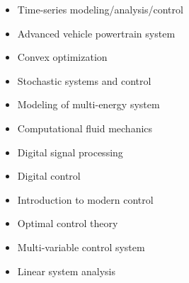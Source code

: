 \documentclass[margin, 9pt]{res} %
\begin{document}
\begin{resume}
\vspace*{-5pt}
\begin{multicols}{2}
\begin{itemize}[leftmargin=*] \itemsep -2pt
   \item Time-series modeling/analysis/control
	\item Advanced vehicle powertrain system
    \item Convex optimization
    \item Stochastic systems and control
    \item Modeling of multi-energy system
    \item Computational fluid mechanics
    \item Digital signal processing
    \item Digital control
    \item Introduction to modern control
    \item Optimal control theory
    \item Multi-variable control system
    \item Linear system analysis
\end{itemize}
\end{multicols}


\end{resume}
\end{document}
